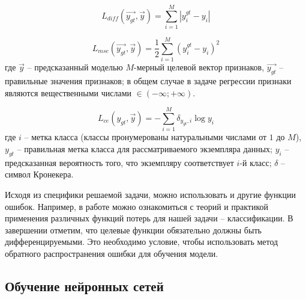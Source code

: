 \begin{equation}\label{eq:diff}
    L_{diff}(\vec{y_{gt}}, \vec{y}) = \sum_{i=1}^M | y^{gt}_{i} - y_{i} |
\end{equation}

\begin{equation}\label{eq: se}
    L_{mse}(\vec{y_{gt}}, \vec{y}) = \frac{1}{2} \sum_{i=1}^M (y^{gt}_{i} - y_{i})^2
\end{equation}
где $\vec{y}$ -- предсказанный моделью $M$-мерный целевой вектор 
признаков, $\vec{y_{gt}}$ -- правильные значения признаков; в общем
случае в задаче регрессии признаки являются вещественными числами
 $\in (- \infty; + \infty )$.

\begin{equation}\label{eq: cross_entropy}
    L_{ce}(y_{gt}, \vec{y}) = - \sum_{i=1}^M \delta_{y_{gt}, i} \log{y_{i}}
\end{equation}
где $i$ -- метка класса (классы пронумерованы натуральными 
числами от $1$ до $M$),
$y_{gt}$ --  правильная метка класса
для рассматриваемого экземпляра данных;
$y_i$ -- предсказанная вероятность того, что 
экземпляру соответствует $i$-й класс;
$\delta$ -- символ Кронекера. 


\indent
\indent
Исходя из специфики решаемой задачи, можно использовать и
другие функции ошибок. Например, в работе \cite{losses} можно
ознакомиться с теорий и практикой применения различных функций 
потерь для нашей задачи -- классификации. В завершении отметим, что 
целевые функции обязательно должны быть дифференцируемыми.
Это необходимо условие, чтобы использовать метод обратного распространения
ошибки для обучения модели.


\subsection{Обучение нейронных сетей}


